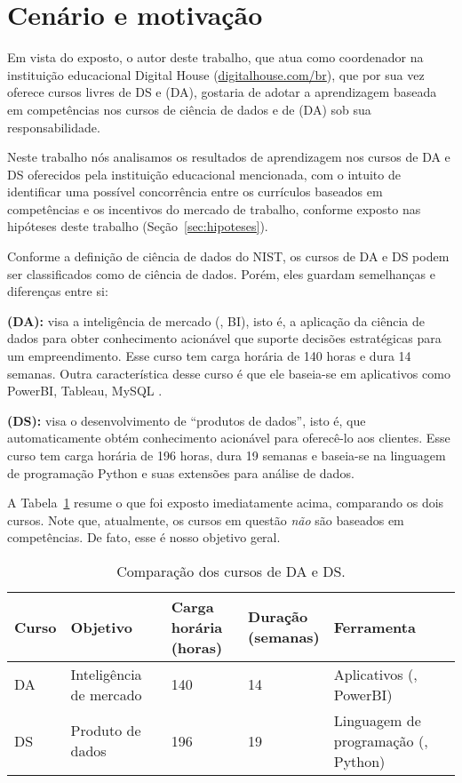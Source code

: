 \section{Cenário e motivação}\label{sec:motivacao}

Em vista do exposto, o autor deste trabalho, que atua como coordenador na instituição educacional Digital House (\url{digitalhouse.com/br}), que por sua vez oferece cursos livres de DS e  (DA), gostaria de adotar a aprendizagem baseada em competências nos cursos de ciência de dados e de  (DA) sob sua responsabilidade.

Neste trabalho nós analisamos os resultados de aprendizagem nos cursos de DA e DS oferecidos pela instituição educacional mencionada, com o intuito de identificar uma possível concorrência entre os currículos baseados em competências e os incentivos do mercado de trabalho, conforme exposto nas hipóteses deste trabalho (Seção~\ref{sec:hipoteses}).

Conforme a definição de ciência de dados do NIST, os cursos de DA e DS podem ser classificados como de ciência de dados.
Porém, eles guardam semelhanças e diferenças entre si:
\begin{compactitem}
	\item \textbf{ (DA):} visa a inteligência de mercado (, BI), isto é, a aplicação da ciência de dados para obter conhecimento acionável que suporte decisões estratégicas para um empreendimento.
	Esse curso tem carga horária de 140 horas e dura 14 semanas.
	Outra característica desse curso é que ele baseia-se em aplicativos como PowerBI, Tableau, MySQL \etc.

	\item \textbf{ (DS):} visa o desenvolvimento de ``produtos de dados'', isto é,  que automaticamente obtém conhecimento acionável para oferecê-lo aos clientes.
	Esse curso tem carga horária de 196 horas, dura 19 semanas e baseia-se na linguagem de programação Python e suas extensões para análise de dados.
\end{compactitem}

A Tabela~\ref{tab:da-vs-ds} resume o que foi exposto imediatamente acima, comparando os dois cursos.
Note que, atualmente, os cursos em questão \emph{não} são baseados em competências.
De fato, esse é nosso objetivo geral.

\begin{table}
	\caption{Comparação dos cursos de DA e DS.}
	\label{tab:da-vs-ds}
	\footnotesize
	\begin{tabular}{lllll}
		\toprule
		Curso & Objetivo & \shortstack[l]{Carga\\horária (horas)} & \shortstack[c]{Duração\\(semanas)} & Ferramenta\\
		\midrule
		DA & Inteligência de mercado & 140 & 14 & Aplicativos (\eg, PowerBI)\\
		DS & Produto de dados & 196 & 19 & Linguagem de programação (\eg, Python)	\\
		\bottomrule
	\end{tabular}
\end{table}